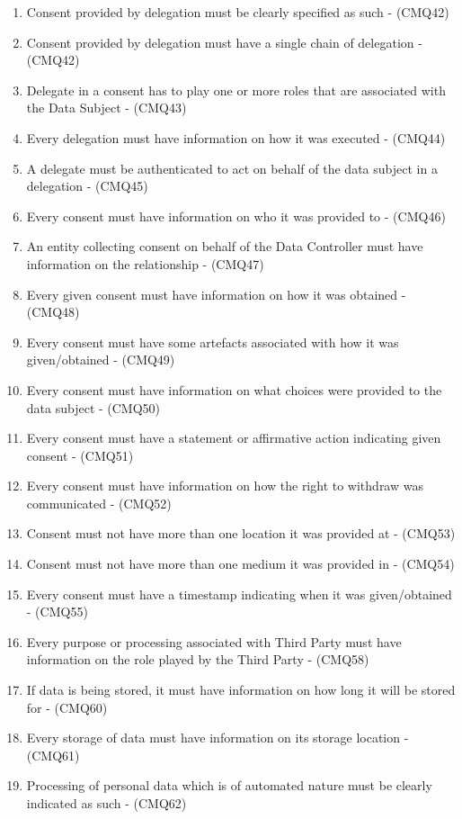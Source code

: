 \begin{enumerate}[label={\textit{C.\theenumi}}]
    \item Consent provided by delegation must be clearly specified as such - (CMQ42)
    \item Consent provided by delegation must have a single chain of delegation - (CMQ42)
    \item Delegate in a consent has to play one or more roles that are associated with the Data Subject - (CMQ43)
    \item Every delegation must have information on how it was executed - (CMQ44)
    \item A delegate must be authenticated to act on behalf of the data subject in a delegation - (CMQ45)
    \item Every consent must have information on who it was provided to - (CMQ46)
    \item An entity collecting consent on behalf of the Data Controller must have information on the relationship - (CMQ47)
    \item Every given consent must have information on how it was obtained - (CMQ48)
    \item Every consent must have some artefacts associated with how it was given/obtained - (CMQ49)
    \item Every consent must have information on what choices were provided to the data subject - (CMQ50)
    \item Every consent must have a statement or affirmative action indicating given consent - (CMQ51)
    \item Every consent must have information on how the right to withdraw was communicated - (CMQ52)
    \item Consent must not have more than one location it was provided at - (CMQ53)
    \item Consent must not have more than one medium it was provided in - (CMQ54)
    \item Every consent must have a timestamp indicating when it was given/obtained - (CMQ55)
    \item Every purpose or processing associated with Third Party must have information on the role played by the Third Party - (CMQ58)
    \item If data is being stored, it must have information on how long it will be stored for - (CMQ60)
    \item Every storage of data must have information on its storage location - (CMQ61)
    \item Processing of personal data which is of automated nature must be clearly indicated as such - (CMQ62)

\end{enumerate}
